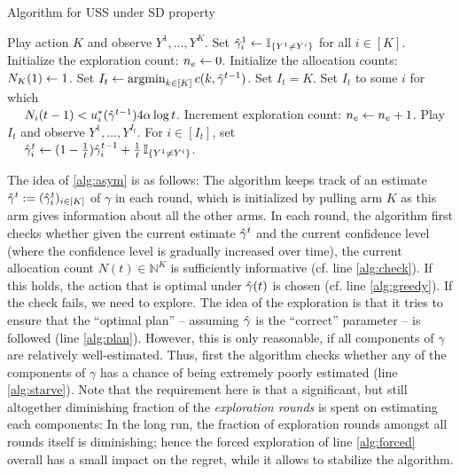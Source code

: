 \documentclass[11pt]{article} %
\newcommand{\N}{\mathbb{N}}
\DeclareMathOperator{\argmin}{argmin}
\begin{document}
\begin{center}
	\begin{minipage}{0.48\textwidth}
		\begin{algorithm}[H]
			\caption{Algorithm for USS under SD property} 
			\label{alg:asym}
			\begin{algorithmic}[1]
				\STATE Play action $K$ and observe  $Y^1,\dots,Y^K$.
				\STATE Set $\hat{\gamma}_{i}^1 \leftarrow \mathbb{I}_{\{Y^1\ne Y^i\}}$ for all $i\in [K]$.
				\STATE Initialize the exploration count: $n_e \leftarrow 0$.
				\STATE Initialize the allocation counts: $N_K(1) \leftarrow 1$.
				 \label{alg:check}
				\STATE Set $I_t \set \argmin_{k\in [K]} c(k,\hgamma^{t-1})$. \label{alg:greedy}
				\ELSE
				 \label{alg:starve}
				\STATE Set $I_t =K$. \label{alg:forced}
				\ELSE
				\STATE Set $I_t$ to some $i$ for which \label{alg:plan} \\
				$\quad$ $N_i(t-1)< u_i^*(\hat{\gamma}^{t-1})4\alpha\log t$.
				\ENDIF
				\STATE Increment exploration count: $n_e \leftarrow n_e+1$.
				\ENDIF
				\STATE Play $I_t$ and observe  $Y^1,\dots,Y^{I_t}$.
				\STATE For $i\in [I_t]$, set\\
				$\quad$ $\hat{\gamma}_i^t \leftarrow (1-{1\over t}) \hat{\gamma}_i^{t-1} + {1\over t} \,\mathbb{I}_{\{Y^1\ne Y^i\}}$.
				\ENDFOR
			\end{algorithmic}
		\end{algorithm}
	\end{minipage}
\end{center}


The idea of \cref{alg:asym} is as follows:
The algorithm keeps track of an estimate $\hat{\gamma}^{t}:=(\hat{\gamma}^t_i)_{i \in [K]}$ of $\gamma$ in each round, which is initialized by pulling arm $K$ as this arm
gives information about all the other arms.
In each round, the algorithm first checks whether given the current estimate $\hat{\gamma}^t$ and the current confidence level (where the confidence level is gradually increased over time), the current allocation count $N(t)\in \N^K$
is sufficiently informative (cf. line \ref{alg:check}). If this holds, the action that is optimal under $\hat{\gamma}(t)$ is chosen 
(cf. line \ref{alg:greedy}). If the check fails, we need to explore.
The idea of the exploration is that it tries to ensure that the ``optimal plan'' -- assuming $\hat{\gamma}$ is the ``correct'' parameter -- is followed (line \ref{alg:plan}). However, this is only reasonable, if all components of $\gamma$ are relatively well-estimated.
Thus, first the algorithm checks whether any of the components of $\gamma$ has a chance of being
extremely poorly estimated (line \ref{alg:starve}). Note that the requirement here is that a significant, but still altogether diminishing fraction of the \emph{exploration rounds} is spent on estimating each components: In the long run, the fraction of exploration rounds amongst all rounds itself is diminishing; hence the forced exploration of line \ref{alg:forced} overall has a small impact on the regret, while it allows to stabilize the algorithm.
\end{document}
